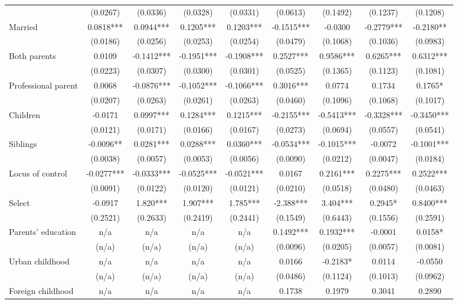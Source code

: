 \documentclass[12pt]{report}
\begin{document}
\begin{sidewaystable}
\begin{tabular}{lc|c|c|c|c|c|c|c}
& (0.0267) & (0.0336) & (0.0328) & (0.0331) & (0.0613) & (0.1492) & (0.1237) & (0.1208)\\
Married & 0.0818*** & 0.0944*** & 0.1205*** & 0.1203*** & -0.1515*** & -0.0300 & -0.2779*** & -0.2180**\\
& (0.0186) & (0.0256) & (0.0253) & (0.0254) & (0.0479) & (0.1068) & (0.1036) & (0.0983)\\
Both parents & 0.0109 & -0.1412*** & -0.1951*** & -0.1908*** & 0.2527*** & 0.9586*** & 0.6265*** & 0.6312***\\
& (0.0223) & (0.0307) & (0.0300) & (0.0301) & (0.0525) & (0.1365) & (0.1123) & (0.1081)\\
Professional parent & 0.0068 & -0.0876*** & -0.1052*** & -0.1066*** & 0.3016*** & 0.0774 & 0.1734 & 0.1765*\\
& (0.0207) & (0.0263) & (0.0261) & (0.0263) & (0.0460) & (0.1096) & (0.1068) & (0.1017)\\
Children & -0.0171 & 0.0997*** & 0.1284*** & 0.1215*** & -0.2155*** & -0.5413*** & -0.3328*** & -0.3450***\\
& (0.0121) & (0.0171) & (0.0166) & (0.0167) & (0.0273) & (0.0694) & (0.0557) & (0.0541)\\
Siblings & -0.0096** & 0.0281*** & 0.0288*** & 0.0360*** & -0.0534*** & -0.1015*** & -0.0072 & -0.1001***\\
& (0.0038) & (0.0057) & (0.0053) & (0.0056) & (0.0090) & (0.0212) & (0.0047) & (0.0184)\\
Locus of control & -0.0277*** & -0.0333*** & -0.0525*** & -0.0521*** & 0.0167 & 0.2161*** & 0.2275*** & 0.2522***\\
& (0.0091) & (0.0122) & (0.0120) & (0.0121) & (0.0210) & (0.0518) & (0.0480) & (0.0463)\\
Select & -0.0917 & 1.820*** & 1.907*** & 1.785*** & -2.388*** & 3.404*** & 0.2945* & 0.8400***\\
& (0.2521) & (0.2633) & (0.2419) & (0.2441) & (0.1549) & (0.6443) & (0.1556) & (0.2591)\\
Parents' education & n/a & n/a & n/a & n/a & 0.1492*** & 0.1932*** & -0.0001 & 0.0158*\\
& (n/a) & (n/a) & (n/a) & (n/a) & (0.0096) & (0.0205) & (0.0057) & (0.0081)\\
Urban childhood & n/a & n/a & n/a & n/a & 0.0166 & -0.2183* & 0.0114 & -0.0550\\
& (n/a) & (n/a) & (n/a) & (n/a) & (0.0486) & (0.1124) & (0.1013) & (0.0962)\\
Foreign childhood & n/a & n/a & n/a & n/a & 0.1738 & 0.1979 & 0.3041 & 0.2890\\

\end{tabular}
\end{sidewaystable}
\end{document}
